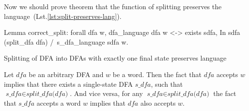







Now we should prove theorem that the function of splitting preserves the language~(Lst.\ref{lst:split-preserves-lang}).

\begin{listing}[h]
    \begin{pyglist}[language=coq, numbers=none, numbersep=5pt]
  Lemma correct_split:
    forall dfa w,
      dfa_language dfa w <->
      exists sdfa, 
         In sdfa (split_dfa dfa) /\ 
         s_dfa_language sdfa w.
    \end{pyglist}
    \caption{Splitting of DFA into DFAs with exactly one final state preserves language}
    \label{lst:split-preserves-lang}
\end{listing}

\begin{theorem}
  Let $\textit{dfa}$ be an arbitrary DFA and $w$ be a word. Then the fact that $\textit{dfa}$ accepts $w$ implies that there exists a single-state DFA $\textit{s\_dfa}$, such that $\textit{s\_dfa} \in \textit{split\_dfa(dfa)}$. And vice versa, for any $\textit{s\_dfa} \in \textit{split\_dfa(dfa)}$ the fact that $\textit{s\_dfa}$ accepts a word $w$ implies that $\textit{dfa}$ also accepts $w$.
\end{theorem}

